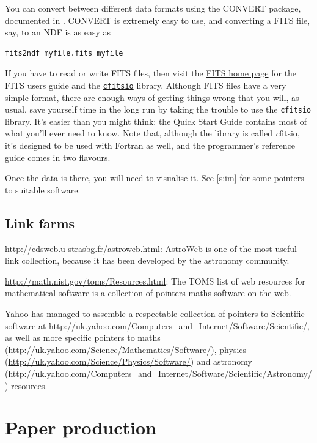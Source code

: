 \documentclass[11pt,oneside,chapters]{starlink}
\begin{document}
You can convert between different data formats using the
CONVERT package, documented in .
CONVERT is extremely easy to use, and
converting a FITS file, say, to an NDF is as easy as

\begin{verbatim}
fits2ndf myfile.fits myfile
\end{verbatim}

If you have to read or write FITS files, then visit the
\href{http://fits.gsfc.nasa.gov/}{FITS home page}
for the FITS users guide and the
\href{http://heasarc.gsfc.nasa.gov/docs/software/fitsio/fitsio.html}{\texttt{cfitsio}}
library.  Although FITS files have a very simple format,
there are enough ways of getting things wrong that you
will, as usual, save yourself time in the long run by
taking the trouble to use the \texttt{cfitsio}
library.  It's easier than you might think: the Quick
Start Guide contains most of what you'll ever need to
know.  Note that, although the library is called
\emph{c}fitsio, it's designed to be used with Fortran as
well, and the programmer's reference guide comes in two
flavours.

Once the data is there, you will need to visualise it.  See
\ref{s:im} for some pointers to suitable
software.

\section{Link farms}
\label{s:link:libs}

\url{http://cdsweb.u-strasbg.fr/astroweb.html}:
AstroWeb is one of the most useful link collection, because
it has been developed by the astronomy community.

\url{http://math.nist.gov/toms/Resources.html}: The
TOMS list of web resources for mathematical software is a
collection of pointers maths software on the web.

Yahoo has managed to assemble a respectable collection of
pointers to Scientific software at
\url{http://uk.yahoo.com/Computers_and_Internet/Software/Scientific/},
as well as more specific pointers to maths
(\url{http://uk.yahoo.com/Science/Mathematics/Software/}),
physics
(\url{http://uk.yahoo.com/Science/Physics/Software/})
and astronomy
(\url{http://uk.yahoo.com/Computers_and_Internet/Software/Scientific/Astronomy/})
resources.

\chapter{Paper production}
\label{s:paper}
\end{document}
